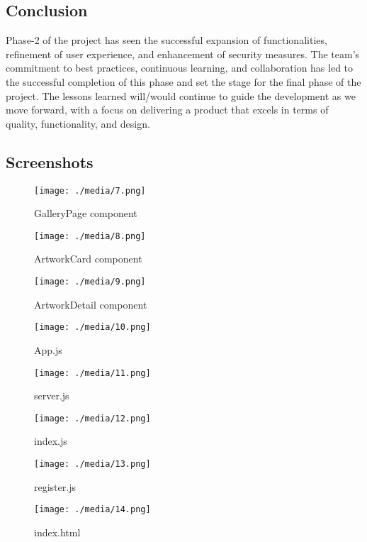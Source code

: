 \documentclass[11pt]{article}
\begin{document}
\subsection{Conclusion}
\label{sec:org50cd81b}

Phase-2 of the project has seen the successful expansion of functionalities,
refinement of user experience, and enhancement of security measures. The team's
commitment to best practices, continuous learning, and collaboration has led to
the successful completion of this phase and set the stage for the final phase of
the project. The lessons learned will/would continue to guide the development as we
move forward, with a focus on delivering a product that excels in terms of
quality, functionality, and design. 

\subsection{Screenshots}
\label{sec:org6b17f0e}

\begin{figure}[htbp]
\centering
\texttt{[image: ./media/7.png]}
\caption{GalleryPage component}
\end{figure}

\begin{figure}[htbp]
\centering
\texttt{[image: ./media/8.png]}
\caption{ArtworkCard component}
\end{figure}

\begin{figure}[htbp]
\centering
\texttt{[image: ./media/9.png]}
\caption{ArtworkDetail component}
\end{figure}

\begin{figure}[htbp]
\centering
\texttt{[image: ./media/10.png]}
\caption{App.js}
\end{figure}

\begin{figure}[htbp]
\centering
\texttt{[image: ./media/11.png]}
\caption{server.js}
\end{figure}

\begin{figure}[htbp]
\centering
\texttt{[image: ./media/12.png]}
\caption{index.js}
\end{figure}

\begin{figure}[htbp]
\centering
\texttt{[image: ./media/13.png]}
\caption{register.js}
\end{figure}

\begin{figure}[htbp]
\centering
\texttt{[image: ./media/14.png]}
\caption{index.html}
\end{figure}
\end{document}
